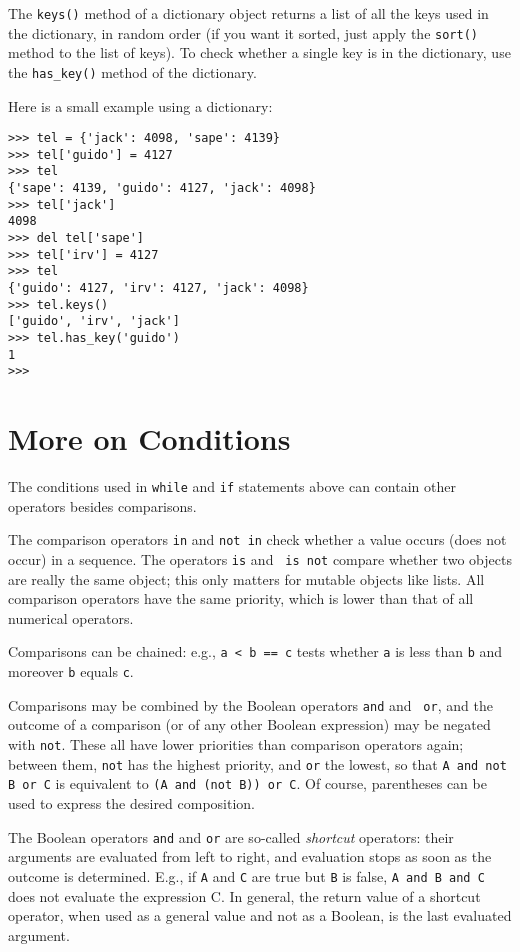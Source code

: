 The {\tt keys()} method of a dictionary object returns a list of all the
keys used in the dictionary, in random order (if you want it sorted,
just apply the {\tt sort()} method to the list of keys).  To check
whether a single key is in the dictionary, use the \verb/has_key()/
method of the dictionary.

Here is a small example using a dictionary:

\bcode\begin{verbatim}
>>> tel = {'jack': 4098, 'sape': 4139}
>>> tel['guido'] = 4127
>>> tel
{'sape': 4139, 'guido': 4127, 'jack': 4098}
>>> tel['jack']
4098
>>> del tel['sape']
>>> tel['irv'] = 4127
>>> tel
{'guido': 4127, 'irv': 4127, 'jack': 4098}
>>> tel.keys()
['guido', 'irv', 'jack']
>>> tel.has_key('guido')
1
>>> 
\end{verbatim}\ecode

\section{More on Conditions}

The conditions used in {\tt while} and {\tt if} statements above can
contain other operators besides comparisons.

The comparison operators {\tt in} and {\tt not in} check whether a value
occurs (does not occur) in a sequence.  The operators {\tt is} and {\tt
is not} compare whether two objects are really the same object; this
only matters for mutable objects like lists.  All comparison operators
have the same priority, which is lower than that of all numerical
operators.

Comparisons can be chained: e.g., {\tt a < b == c} tests whether {\tt a}
is less than {\tt b} and moreover {\tt b} equals {\tt c}.

Comparisons may be combined by the Boolean operators {\tt and} and {\tt
or}, and the outcome of a comparison (or of any other Boolean
expression) may be negated with {\tt not}.  These all have lower
priorities than comparison operators again; between them, {\tt not} has
the highest priority, and {\tt or} the lowest, so that
{\tt A and not B or C} is equivalent to {\tt (A and (not B)) or C}.  Of
course, parentheses can be used to express the desired composition.

The Boolean operators {\tt and} and {\tt or} are so-called {\em
shortcut} operators: their arguments are evaluated from left to right,
and evaluation stops as soon as the outcome is determined.  E.g., if
{\tt A} and {\tt C} are true but {\tt B} is false, {\tt A and B and C}
does not evaluate the expression C.  In general, the return value of a
shortcut operator, when used as a general value and not as a Boolean, is
the last evaluated argument.

